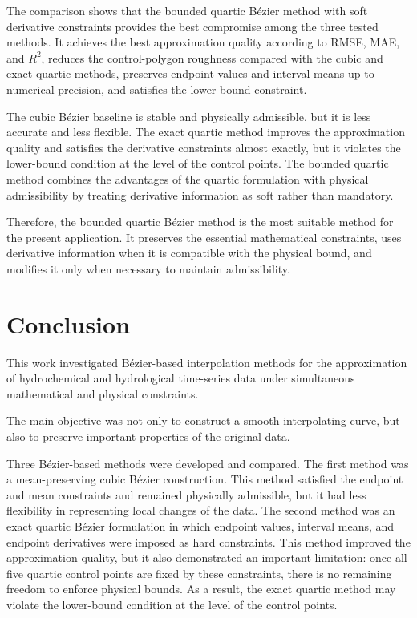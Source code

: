 \documentclass[12pt,a4paper]{article}
\begin{document}
The comparison shows that the bounded quartic B\'ezier method with soft
derivative constraints provides the best compromise among the three tested
methods. It achieves the best approximation quality according to RMSE, MAE,
and \(R^2\), reduces the control-polygon roughness compared with the cubic and
exact quartic methods, preserves endpoint values and interval means up to
numerical precision, and satisfies the lower-bound constraint.

The cubic B\'ezier baseline is stable and physically admissible, but it is
less accurate and less flexible. The exact quartic method improves the
approximation quality and satisfies the derivative constraints almost exactly,
but it violates the lower-bound condition at the level of the control points.
The bounded quartic method combines the advantages of the quartic formulation
with physical admissibility by treating derivative information as soft rather
than mandatory.

Therefore, the bounded quartic B\'ezier method is the most suitable method for
the present application. It preserves the essential mathematical constraints,
uses derivative information when it is compatible with the physical bound, and
modifies it only when necessary to maintain admissibility.

\newpage
\section{Conclusion}
This work investigated B\'ezier-based interpolation methods for the
approximation of hydrochemical and hydrological time-series data under
simultaneous mathematical and physical constraints. 

The main objective was not only to construct a smooth interpolating curve,
but also to preserve important properties of the original data.

Three B\'ezier-based methods were developed and compared. The first method
was a mean-preserving cubic B\'ezier construction. This method satisfied the
endpoint and mean constraints and remained physically admissible, but it had
less flexibility in representing local changes of the data. The second method
was an exact quartic B\'ezier formulation in which endpoint values, interval
means, and endpoint derivatives were imposed as hard constraints. This method
improved the approximation quality, but it also demonstrated an important
limitation: once all five quartic control points are fixed by these
constraints, there is no remaining freedom to enforce physical bounds. As a
result, the exact quartic method may violate the lower-bound condition at the
level of the control points.
\end{document}
